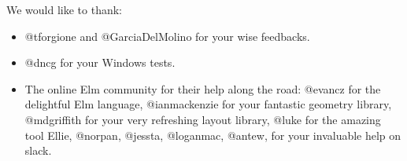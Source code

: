 \begin{acks}

We would like to thank:

\begin{itemize}
	\item @tforgione and @GarciaDelMolino for your wise feedbacks.
	\item @dncg for your Windows tests.
	\item The online Elm community for their help along the road:
		@evancz for the delightful Elm language,
		@ianmackenzie for your fantastic geometry library,
		@mdgriffith for your very refreshing layout library,
		@luke for the amazing tool Ellie,
		@norpan, @jessta, @loganmac, @antew, for your invaluable help on slack.
\end{itemize}

\end{acks}

